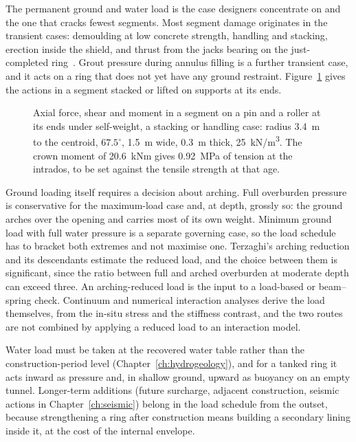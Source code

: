 The permanent ground and water load is the case designers concentrate on and
the one that cracks fewest segments. Most segment damage originates in the
transient cases: demoulding at low concrete strength, handling and stacking,
erection inside the shield, and thrust from the jacks bearing on the
just-completed ring~\citep{ita2019segmental}. Grout pressure during annulus filling is a further
transient case, and it acts on a ring that does not yet have any ground
restraint. Figure~\ref{fig:segment-actions} gives the actions in a segment
stacked or lifted on supports at its ends.

\begin{figure}[htbp]
\centering
{}
\caption{Axial force, shear and moment in a segment on a pin and a roller at its ends under self-weight, a stacking or handling case: radius 3.4~m to the centroid, $67.5^\circ$, 1.5~m wide, 0.3~m thick, 25~kN/m\textsuperscript{3}. The crown moment of 20.6~kNm gives 0.92~MPa of tension at the intrados, to be set against the tensile strength at that age.}
\label{fig:segment-actions}
\end{figure}

Ground loading itself requires a decision about arching. Full overburden
pressure is conservative for the maximum-load case and, at depth, grossly so:
the ground arches over the opening and carries most of its own weight.
Minimum ground load with full water pressure is a separate governing case, so
the load schedule has to bracket both extremes and not maximise one. Terzaghi's arching
reduction and its descendants estimate the reduced load, and the choice between
them is significant, since the ratio between full and arched overburden at
moderate depth can exceed three. An arching-reduced load is the input to a load-based
or beam--spring check. Continuum and numerical interaction analyses derive
the load themselves, from the in-situ stress and the stiffness contrast, and
the two routes are not combined by applying a reduced load to an interaction
model.

Water load must be taken at the recovered water table rather than the
construction-period level (Chapter~\ref{ch:hydrogeology}), and for a tanked
ring it acts inward as pressure and, in shallow ground, upward as buoyancy on
an empty tunnel. Longer-term additions (future surcharge, adjacent
construction, seismic actions in Chapter~\ref{ch:seismic}) belong in the
load schedule from the outset, because strengthening a ring after
construction means building a secondary lining inside it, at the cost of the
internal envelope.

